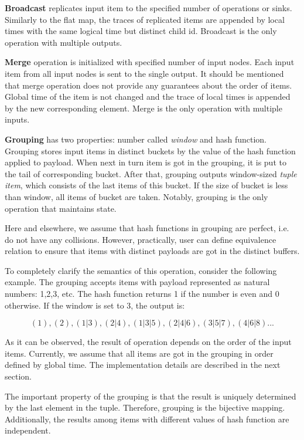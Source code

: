 {\bf Broadcast} replicates input item to the specified number of operations or sinks. Similarly to the flat map, the traces of replicated items are appended by local times with the same logical time but distinct child id. Broadcast is the only operation with multiple outputs.

{\bf Merge} operation is initialized with specified number of input nodes. Each input item from all input nodes is sent to the single output. It should be mentioned that merge operation does not provide any guarantees about the order of items. Global time of the item is not changed and the trace of local times is appended by the new corresponding element. Merge is the only operation with multiple inputs.

{\bf Grouping} has two properties: number called {\it window} and hash function. Grouping stores input items in distinct buckets by the value of the hash function applied to payload. When next in turn item is got in the grouping, it is put to the tail of corresponding bucket. After that, grouping outputs window-sized {\it tuple item}, which consists of the last items of this bucket. If the size of bucket is less than window, all items of bucket are taken. Notably, grouping is the only operation that maintains state.
	
Here and elsewhere, we assume that hash functions in grouping are perfect, i.e. do not have any collisions. However, practically, user can define equivalence relation to ensure that items with distinct payloads are got in the distinct buffers.
	
To completely clarify the semantics of this operation, consider the following example. The grouping accepts items with payload represented as natural numbers: 1,2,3, etc. The hash function returns 1 if the number is even and 0 otherwise. If the window is set to 3, the output is:

\[(1), (2), (1|3), (2|4), (1|3|5), (2|4|6), (3|5|7), (4|6|8)...\]

As it can be observed, the result of operation depends on the order of the input items. Currently, we assume that all items are got in the grouping in order defined by global time. The implementation details are described in the next section. 

The important property of the grouping is that the result is uniquely determined by the last element in the tuple. Therefore, grouping is the bijective mapping. Additionally, the results among items with different values of hash function are independent.

